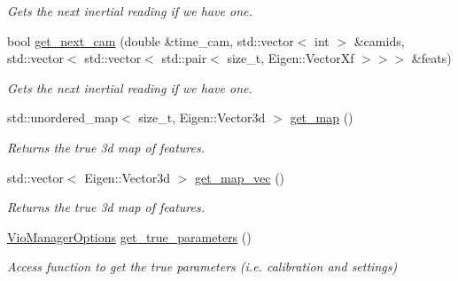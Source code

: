 \begin{DoxyCompactItemize}
\begin{DoxyCompactList}\small\item\em Gets the next inertial reading if we have one. \end{DoxyCompactList}\item 
bool \hyperlink{classov__msckf_1_1Simulator_add03be2fbfa53224369b07411b6a81b7}{get\+\_\+next\+\_\+cam} (double \&time\+\_\+cam, std\+::vector$<$ int $>$ \&camids, std\+::vector$<$ std\+::vector$<$ std\+::pair$<$ size\+\_\+t, Eigen\+::\+Vector\+Xf $>$$>$$>$ \&feats)
\begin{DoxyCompactList}\small\item\em Gets the next inertial reading if we have one. \end{DoxyCompactList}\item 
\mbox{\label{classov__msckf_1_1Simulator_aca2fcef0b73e4c570049030438caa60b}} 
std\+::unordered\+\_\+map$<$ size\+\_\+t, Eigen\+::\+Vector3d $>$ \hyperlink{classov__msckf_1_1Simulator_aca2fcef0b73e4c570049030438caa60b}{get\+\_\+map} ()
\begin{DoxyCompactList}\small\item\em Returns the true 3d map of features. \end{DoxyCompactList}\item 
\mbox{\label{classov__msckf_1_1Simulator_aa6f03a9aefbf97bccf950059608bd3c1}} 
std\+::vector$<$ Eigen\+::\+Vector3d $>$ \hyperlink{classov__msckf_1_1Simulator_aa6f03a9aefbf97bccf950059608bd3c1}{get\+\_\+map\+\_\+vec} ()
\begin{DoxyCompactList}\small\item\em Returns the true 3d map of features. \end{DoxyCompactList}\item 
\mbox{\label{classov__msckf_1_1Simulator_a3a7f99eb6dd01918d88f6db017c83830}} 
\hyperlink{structov__msckf_1_1VioManagerOptions}{Vio\+Manager\+Options} \hyperlink{classov__msckf_1_1Simulator_a3a7f99eb6dd01918d88f6db017c83830}{get\+\_\+true\+\_\+parameters} ()
\begin{DoxyCompactList}\small\item\em Access function to get the true parameters (i.\+e. calibration and settings) \end{DoxyCompactList}\end{DoxyCompactItemize}
